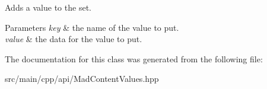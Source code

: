 Adds a value to the set.


\begin{DoxyParams}{Parameters}
{\em key} & the name of the value to put. \\
\hline
{\em value} & the data for the value to put. \\
\hline
\end{DoxyParams}


The documentation for this class was generated from the following file\+:\begin{DoxyCompactItemize}
\item 
src/main/cpp/api/Mad\+Content\+Values.\+hpp\end{DoxyCompactItemize}
